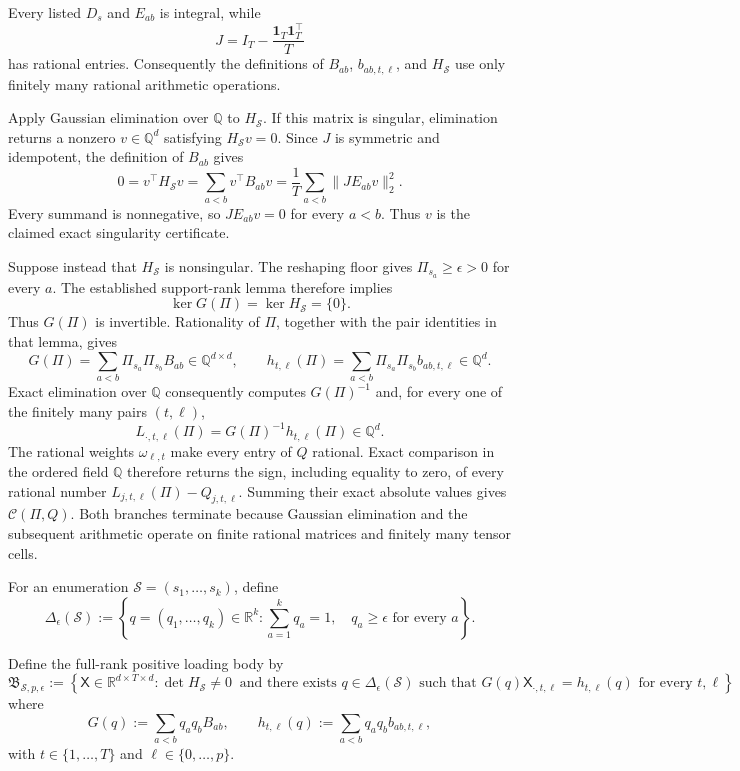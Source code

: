 Every listed \(D_s\) and \(E_{ab}\) is integral, while
\[
 J=I_T-\frac{\mathbf 1_T\mathbf 1_T^{\top}}{T}
\]
has rational entries.  Consequently the definitions of \(B_{ab}\), \(b_{ab,t,\ell}\), and \(H_{\mathcal S}\) use only finitely many rational arithmetic operations.

Apply Gaussian elimination over \(\mathbb Q\) to \(H_{\mathcal S}\).  If this matrix is singular, elimination returns a nonzero \(v\in\mathbb Q^d\) satisfying \(H_{\mathcal S}v=0\).  Since \(J\) is symmetric and idempotent, the definition of \(B_{ab}\) gives
\[
 0=v^{\top}H_{\mathcal S}v
 =\sum_{a<b}v^{\top}B_{ab}v
 =\frac1T\sum_{a<b}\lVert JE_{ab}v\rVert_2^2.
\]
Every summand is nonnegative, so \(JE_{ab}v=0\) for every \(a<b\).  Thus \(v\) is the claimed exact singularity certificate.

Suppose instead that \(H_{\mathcal S}\) is nonsingular.  The reshaping floor gives \(\Pi_{s_a}\geq\epsilon>0\) for every \(a\).  The established support-rank lemma therefore implies
\[
 \ker G(\Pi)=\ker H_{\mathcal S}=\{0\}.
\]
Thus \(G(\Pi)\) is invertible.  Rationality of \(\Pi\), together with the pair identities in that lemma, gives
\[
 G(\Pi)=\sum_{a<b}\Pi_{s_a}\Pi_{s_b}B_{ab}\in\mathbb Q^{d\times d},
 \qquad
 h_{t,\ell}(\Pi)=\sum_{a<b}\Pi_{s_a}\Pi_{s_b}b_{ab,t,\ell}\in\mathbb Q^d.
\]
Exact elimination over \(\mathbb Q\) consequently computes \(G(\Pi)^{-1}\) and, for every one of the finitely many pairs \((t,\ell)\),
\[
 L_{\cdot,t,\ell}(\Pi)=G(\Pi)^{-1}h_{t,\ell}(\Pi)\in\mathbb Q^d.
\]
The rational weights \(\omega_{\ell,t}\) make every entry of \(Q\) rational.  Exact comparison in the ordered field \(\mathbb Q\) therefore returns the sign, including equality to zero, of every rational number \(L_{j,t,\ell}(\Pi)-Q_{j,t,\ell}\).  Summing their exact absolute values gives \(\mathcal C(\Pi,Q)\).  Both branches terminate because Gaussian elimination and the subsequent arithmetic operate on finite rational matrices and finitely many tensor cells.

For an enumeration \(\mathcal S=(s_1,\ldots,s_k)\), define
\[
 \Delta_{\epsilon}(\mathcal S)
 :=\left\{q=(q_1,\ldots,q_k)\in\mathbb R^k:
          \sum_{a=1}^k q_a=1,\quad q_a\geq\epsilon
          \text{ for every }a\right\}.
\]

Define the full-rank positive loading body by
\[
 \mathfrak B_{\mathcal S,p,\epsilon}
 :=\left\{\mathsf X\in\mathbb R^{d\times T\times d}:
 \det H_{\mathcal S}\neq0\ \text{ and there exists }q\in\Delta_{\epsilon}(\mathcal S)
 \text{ such that }
 G(q)\mathsf X_{\cdot,t,\ell}=h_{t,\ell}(q)
 \text{ for every }t,\ell\right\},
\]
where
\[
 G(q):=\sum_{a<b}q_aq_bB_{ab},
 \qquad
 h_{t,\ell}(q):=\sum_{a<b}q_aq_bb_{ab,t,\ell},
\]
with \(t\in\{1,\ldots,T\}\) and \(\ell\in\{0,\ldots,p\}\).

